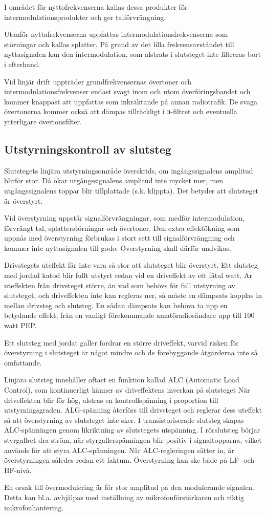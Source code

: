 I området för nyttofrekvenserna kallas dessa produkter för
intermodulationsprodukter och ger talförvrängning.

Utanför nyttafrekvenserna uppfattas intermodulationsfrekvenserna som
störningar och kallas splatter. På grund av det lilla
frekvensavståndet till nyttasignalen kan den intermodulation, som
alstrats i slutsteget inte filtreras bort i efterhand.

Vid linjär drift uppträder grundfrekvensernas övertoner och
intermodulationsfrekvenser endast svagt inom och utom
överföringsbandet och kommer knappast att uppfattas som inkräktande på
annan radiotrafik.  De svaga övertonerna kommer också att dämpas
tillräckligt i π-filtret och eventuella ytterligare övertonsfilter.


\subsection{Utstyrningskontroll av slutsteg}

Slutstegets linjära utstyrningsområde överskrids, om ingångssignalens
amplitud blirför stor. Då ökar utgångssignalens amplitud inte mycket
mer, men utgångssignalens toppar blir tillplattade (s.k. klippta). Det
betyder att slutsteget är överstyrt.

Vid överstyrning uppstår signalförvrängningar, som medför
intermodulation, förvrängt tal, splatterstörningar och övertoner.  Den
extra effektökning som uppnås med överstyrning förbrukas i stort sett
till signalförvrängning och kommer inte nyttasignalen till
godo. Överstyrning skall därför undvikas.

Drivstegets uteffekt får inte vara så stor att slutsteget blir
överstyrt. Ett slutsteg med jordad katod blir fullt utstyrt redan vid
en driveffekt av ett fåtal watt. Ar uteffekten från drivsteget större,
än vad som behövs för full utstyrning av slutsteget, och driveffekten
inte kan regleras ner, så måste en dämpsats kopplas in mellan drivsteg
och slutsteg. En sådan dämpsats kan behöva ta upp en betydande effekt,
från en vanligt förekommande amatöradiosändare upp till 100 watt PEP.

Ett slutsteg med jordat galler fordrar en större driveffekt, varvid
risken för överstyrning i slutsteget är något mindre och de
förebyggande åtgärderna inte så omfattande.

Linjära slutsteg innehåller oftast en funktion kallad ALC (Automatic
Load Control), som kontinuerligt känner av driveffektens inverkan på
slutsteget När driveffekten blir för hög, alstras en kontrollspänning
i proportion till utstyrningsgraden. ALG-spänning återförs till
drivsteget och reglerar dess uteffekt så att överstyrning av
slutsteget inte sker. I transistoriserade slutsteg skapas
ALC-spänningen genom likriktning av slutstegets utspänning. I
rörslutsteg börjar styrgallret dra ström, när styrgallerspänningen
blir positiv i signaltopparna, vilket används för att styra
ALC-spänningen. När ALC-regleringen sätter in, är överstyrningen
således redan ett faktum. Överstyrning kan ske både på LF- och HF-nivå.

En orsak till övermodulering är för stor amplitud på den modulerande
signalen. Detta kan bl.a. avhjälpas med inställning av
mikrofonförstärkaren och riktig mikrofonhantering.

